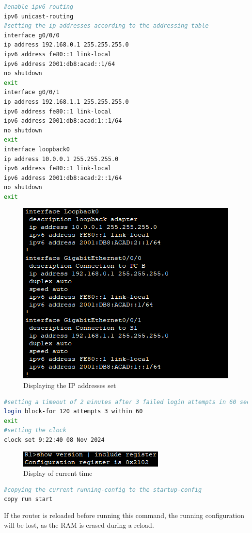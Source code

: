 \documentclass[a4paper]{article}
\newcommand{\abc}{\hfill \break}
\begin{document}
\begin{lstlisting}[language=bash,
	keywordstyle=\color{black},
	rulecolor=\color{blue}]
#enable ipv6 routing
ipv6 unicast-routing
#setting the ip addresses according to the addressing table
interface g0/0/0
ip address 192.168.0.1 255.255.255.0
ipv6 address fe80::1 link-local
ipv6 address 2001:db8:acad::1/64
no shutdown
exit
interface g0/0/1
ip address 192.168.1.1 255.255.255.0
ipv6 address fe80::1 link-local
ipv6 address 2001:db8:acad:1::1/64
no shutdown
exit
interface loopback0
ip address 10.0.0.1 255.255.255.0
ipv6 address fe80::1 link-local
ipv6 address 2001:db8:acad:2::1/64
no shutdown
exit
\end{lstlisting}
\newpage
\begin{figure}[h]
	\includegraphics[scale=0.55]{images/showip.png}
	\centering
	\caption{Displaying the IP addresses set}
\end{figure}
\begin{lstlisting}[language=bash,
	keywordstyle=\color{black},
	rulecolor=\color{blue}]
#setting a timeout of 2 minutes after 3 failed login attempts in 60 seconds
login block-for 120 attempts 3 within 60
exit
#setting the clock
clock set 9:22:40 08 Nov 2024
\end{lstlisting}
\begin{figure}[h]
	\includegraphics[scale=0.55]{images/showclock.png}
	\centering
	\caption{Display of current time}
\end{figure}\abc

\begin{lstlisting}[language=bash,
	keywordstyle=\color{black},
	rulecolor=\color{blue}]
#copying the current running-config to the startup-config
copy run start
\end{lstlisting}
If the router is reloaded before running this command, the running configuration will be lost, as the RAM is erased during a reload.
\newpage
\end{document}
